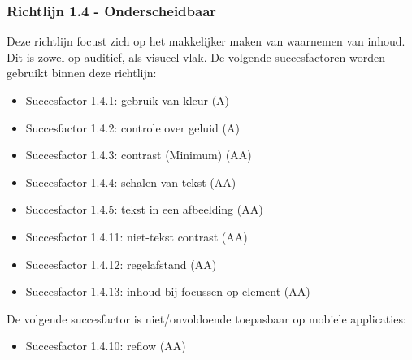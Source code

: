 \subsubsection{Richtlijn 1.4 - Onderscheidbaar}
Deze richtlijn focust zich op het makkelijker maken van waarnemen van inhoud. Dit is zowel op auditief, als visueel vlak.  De volgende succesfactoren worden gebruikt binnen deze richtlijn:
\begin{itemize}
    \item  Succesfactor 1.4.1:  gebruik van kleur (A)
    \item Succesfactor 1.4.2:  controle over geluid (A)
    \item Succesfactor 1.4.3:  contrast (Minimum) (AA)
    \item Succesfactor 1.4.4:  schalen van tekst (AA)
    \item Succesfactor 1.4.5:  tekst in een afbeelding (AA)
    \item Succesfactor 1.4.11:  niet-tekst contrast (AA)
    \item Succesfactor 1.4.12:  regelafstand (AA)
    \item Succesfactor 1.4.13:  inhoud bij focussen op element (AA)
\end{itemize}

De volgende succesfactor is niet/onvoldoende toepasbaar op mobiele applicaties: \begin{itemize}
    \item Succesfactor 1.4.10:  reflow (AA)
\end{itemize}



